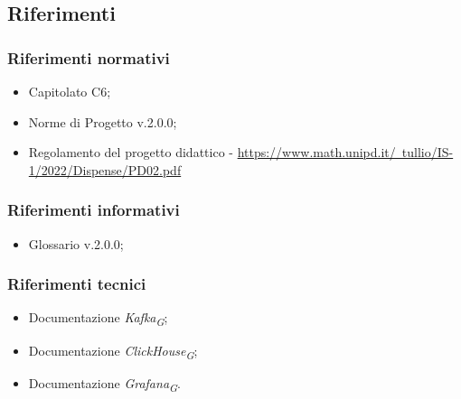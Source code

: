 \subsection{Riferimenti}
\subsubsection{Riferimenti normativi}
\begin{itemize}
    \item Capitolato C6;
    \item Norme di Progetto v.2.0.0;
    \item  Regolamento del progetto didattico - \href{https://www.math.unipd.it/~tullio/IS-1/2022/Dispense/PD02.pdf}{https://www.math.unipd.it/~tullio/IS-1/2022/Dispense/PD02.pdf}
\end{itemize}
\subsubsection{Riferimenti informativi}
\begin{itemize}
    \item Glossario v.2.0.0;
\end{itemize}
\subsubsection{Riferimenti tecnici}
\begin{itemize}
    \item Documentazione \textit{Kafka}\textsubscript{\textit{G}}; 
    \item Documentazione \textit{ClickHouse}\textsubscript{\textit{G}}; 
    \item Documentazione \textit{Grafana}\textsubscript{\textit{G}}.
\end{itemize}
